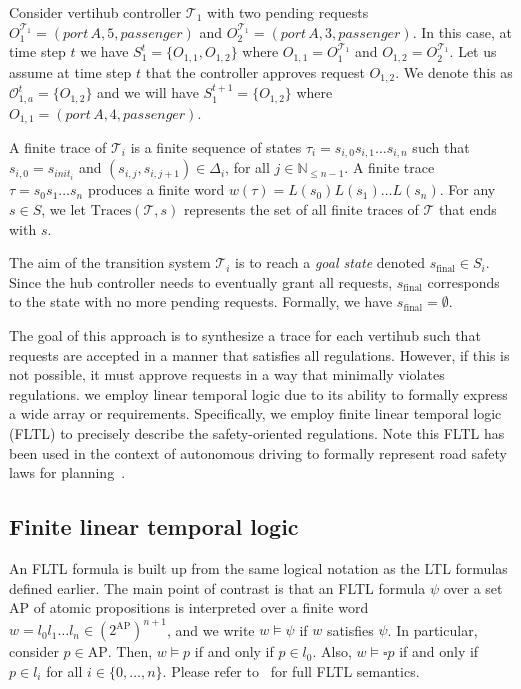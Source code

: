 \begin{eg}
Consider vertihub controller $\mathcal{T}_1$ with two pending requests $O^{\mathcal{T}_1}_1 = \left(port\, A, 5, passenger \right)$ and $O^{\mathcal{T}_1}_2= \left(port\, A, 3, passenger \right)$. In this case, at time step $t$ we have $S_1^t = \{O_{1,1},O_{1,2}\}$ where $O_{1,1} = O^{\mathcal{T}_1}_1$ and $O_{1,2} = O^{\mathcal{T}_1}_2$. Let us assume at time step $t$ that the controller approves request $O_{1,2}$. We denote this as $\mathcal{O}^{t}_{1,a} = \{O_{1,2} \}$ and we will have $S^{t+1}_1 = \{O_{1,2}\}$ where $ O_{1,1} = \left(port\, A, 4, passenger \right)$. 
\end{eg}


A finite trace of $\mathcal{T}_i$ is a finite sequence of states $\tau_i = s_{i,0} s_{i,1} \ldots s_{i,n}$ such that
$s_{i,0} = s_{\textit{init}_i}$ and $(s_{i,j}, s_{i,j+1}) \in \Delta_i$, for all $j \in \mathbb{N}_{\leq n-1}$.
A finite trace $\tau = s_0 s_1 \ldots s_n$ produces a finite word $w(\tau) = L(s_0) L(s_1) \ldots L(s_n)$. For any $s \in S$, we let $\text{Traces}(\mathcal{T}, s)$ represents the set of all finite traces of $\mathcal{T}$ that ends with $s$.

The aim of the transition system $\mathcal{T}_i$ is to reach a \emph{goal state} denoted $s_{\text{final}} \in S_i$. Since the hub controller needs to eventually grant all requests, $s_{\text{final}}$ corresponds to the state with no more pending requests. Formally, we have $s_{\text{final}} = \emptyset$.  

The goal of this approach is to synthesize a trace for each vertihub such that requests are accepted in a manner that satisfies all regulations. However, if this is not possible, it must approve requests in a way that minimally violates regulations. we employ linear temporal logic due to its ability to formally express a wide array or requirements. Specifically, we employ finite linear temporal logic (FLTL) to precisely describe the safety-oriented regulations. Note this FLTL has been used in the context of autonomous driving to formally represent road safety laws for planning~\cite{Tumova:2013:ACC,Tumova:2013:LCS}. 

\subsection{Finite linear temporal logic}
An FLTL formula is built up from the same logical notation as the LTL formulas defined earlier. The main point of contrast is that an FLTL formula $\psi$ over a set $\text{AP}$ of atomic propositions is interpreted over a finite word
$w = l_0 l_1 \ldots l_n \in (2^{\text{AP}})^{n+1}$,
and we write $w \models \psi$ if $w$ satisfies $\psi$.
In particular, consider $p \in \text{AP}$. Then,
$w \models p$ if and only if $p \in l_0$. Also,
$w \models \square p$
if and only if $p \in l_i$ for all $i \in \{0, \ldots, n\}$. Please refer to~\cite{gunter2002temporal} for full FLTL semantics. 

